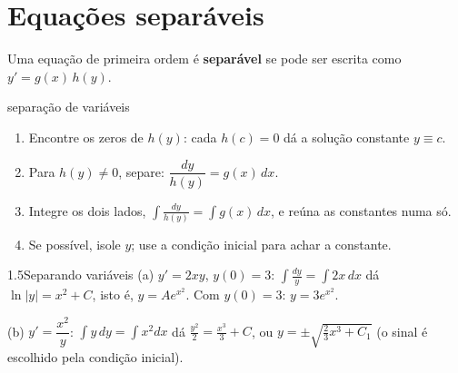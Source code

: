 
\section{Equações separáveis}

\begin{definicao}
Uma equação de primeira ordem é \textbf{separável} se pode ser
escrita como $y'=g(x)\,h(y)$.
\end{definicao}

\begin{estrategia}{separação de variáveis}
\begin{enumerate}[label=\arabic*.]
\item Encontre os zeros de $h(y)$: cada $h(c)=0$ dá a solução constante $y\equiv c$.
\item Para $h(y)\neq0$, separe: $\dfrac{dy}{h(y)}=g(x)\,dx$.
\item Integre os dois lados, $\displaystyle\int\frac{dy}{h(y)}=\int g(x)\,dx$, e reúna as
  constantes numa só.
\item Se possível, isole $y$; use a condição inicial para achar a constante.
\end{enumerate}
\end{estrategia}

\begin{exemplo}{1.5}{Separando variáveis}
(a) $y'=2xy$, $y(0)=3$: $\int\frac{dy}y=\int2x\,dx$ dá $\ln|y|=x^2+C$, isto é,
$y=Ae^{x^2}$. Com $y(0)=3$: $y=3e^{x^2}$.

(b) $y'=\dfrac{x^2}{y}$: $\int y\,dy=\int x^2dx$ dá $\frac{y^2}2=\frac{x^3}3+C$, ou
$y=\pm\sqrt{\tfrac23x^3+C_1}$ (o sinal é escolhido pela condição inicial).
\end{exemplo}

